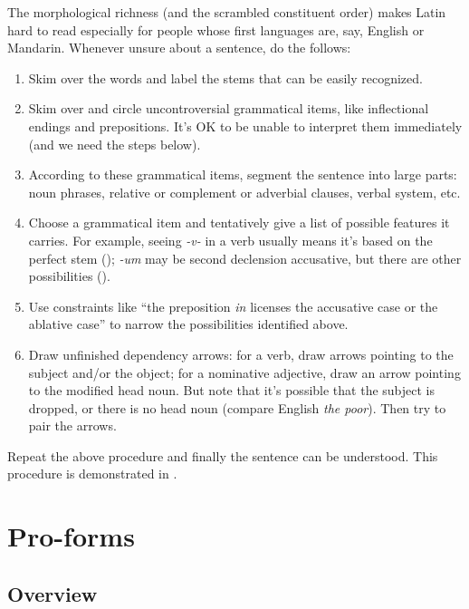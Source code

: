 \documentclass[a4paper, oneside, 12pt]{report}
\newcommand{\form}[1]{\emph{#1}}
\begin{document}
The morphological richness (and the scrambled constituent order)
makes Latin hard to read 
especially for people whose first languages are, say, 
English or Mandarin. 
Whenever unsure about a sentence, do the follows: 
\begin{enumerate}
    \item Skim over the words and label the stems that can be easily recognized.  
    \item Skim over and circle uncontroversial grammatical items,  
        like inflectional endings and prepositions. 
        It's OK to be unable to interpret them immediately (and we need the steps below).
    \item According to these grammatical items, 
        segment the sentence into large parts:
        noun phrases, relative or complement or adverbial clauses, 
        verbal system, etc.
    \item Choose a grammatical item and tentatively give a list of possible features it carries.  
        For example, seeing \form{-v-} in a verb usually means
        it's based on the perfect stem
        ();
        \form{-um} may be second declension accusative,
        but there are other possibilities
        (). 
    \item Use constraints like 
        ``the preposition \form{in} licenses the accusative case or the ablative case'' 
        to narrow the possibilities identified above.
    \item Draw unfinished dependency arrows:
        for a verb, draw arrows pointing to the subject and/or the object; 
        for a nominative adjective, draw an arrow pointing to the modified head noun. 
        But note that it's possible that the subject is dropped, 
        or there is no head noun (compare English \form{the poor}).
        Then try to pair the arrows.
\end{enumerate}
Repeat the above procedure and finally the sentence can be understood. 
This procedure is demonstrated in .


\chapter{Pro-forms}\label{chap:pro-forms}

\section{Overview}
\end{document}
